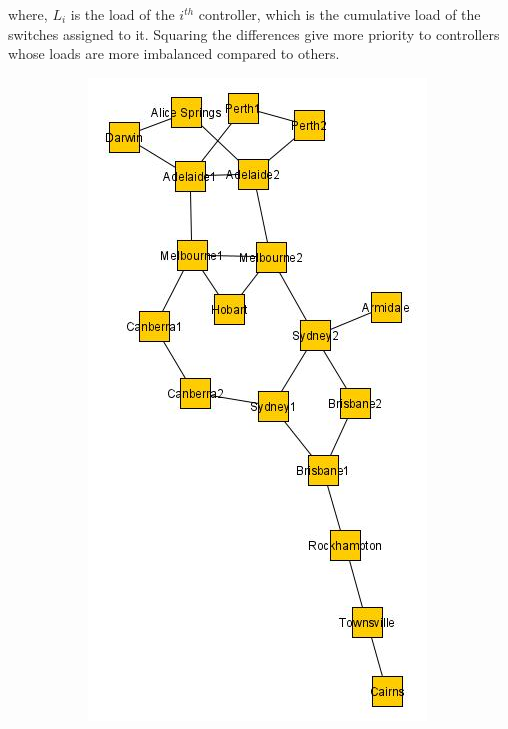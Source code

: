 \documentclass[journal]{IEEEtran}
\begin{document}
where, $L_i$ is the load of the $i^{th}$ controller, which is the cumulative load of the switches assigned to it. Squaring the differences give more priority to controllers whose loads are more imbalanced compared to others.

\begin{figure}
	\centering
	\begin{subfigure}{0.3\textwidth}
		\includegraphics[width=\linewidth]{Images/Aarnet_Graph.jpg}

\end{subfigure}
\end{figure}
\end{document}
